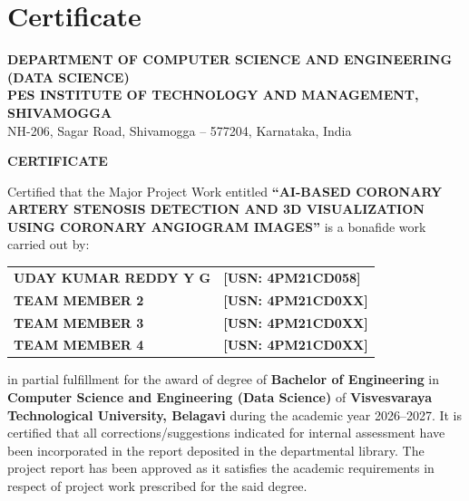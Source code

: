 \chapter*{Certificate}

\begin{center}
\textbf{\large DEPARTMENT OF COMPUTER SCIENCE AND ENGINEERING (DATA SCIENCE)}\\
\textbf{\large PES INSTITUTE OF TECHNOLOGY AND MANAGEMENT, SHIVAMOGGA}\\
{\small NH-206, Sagar Road, Shivamogga -- 577204, Karnataka, India}\\[0.5cm]

\begin{figure}[H]
\centering
{}
\end{figure}

\textbf{\large CERTIFICATE}\\[0.4cm]
\end{center}

Certified that the Major Project Work entitled \textbf{``AI-BASED CORONARY ARTERY STENOSIS DETECTION AND 3D VISUALIZATION USING CORONARY ANGIOGRAM IMAGES''} is a bonafide work carried out by:

\begin{center}
\begin{tabular}{ll}
\textbf{UDAY KUMAR REDDY Y G} & \textbf{[USN: 4PM21CD058]} \\
\textbf{TEAM MEMBER 2} & \textbf{[USN: 4PM21CD0XX]} \\
\textbf{TEAM MEMBER 3} & \textbf{[USN: 4PM21CD0XX]} \\
\textbf{TEAM MEMBER 4} & \textbf{[USN: 4PM21CD0XX]} \\
\end{tabular}
\end{center}

in partial fulfillment for the award of degree of \textbf{Bachelor of Engineering} in \textbf{Computer Science and Engineering (Data Science)} of \textbf{Visvesvaraya Technological University, Belagavi} during the academic year 2026--2027. It is certified that all corrections/suggestions indicated for internal assessment have been incorporated in the report deposited in the departmental library. The project report has been approved as it satisfies the academic requirements in respect of project work prescribed for the said degree.

